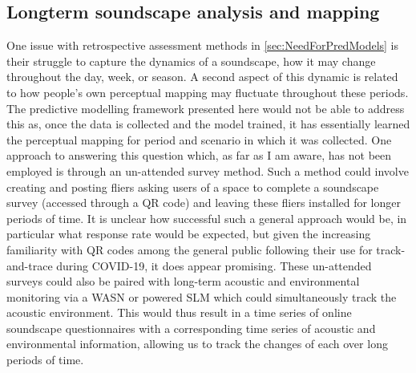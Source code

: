 \subsection{Longterm soundscape analysis and mapping}
One issue with retrospective assessment methods in \cref{sec:NeedForPredModels} is their struggle to capture the dynamics of a soundscape, how it may change throughout the day, week, or season. A second aspect of this dynamic is related to how people's own perceptual mapping may fluctuate throughout these periods. The predictive modelling framework presented here would not be able to address this as, once the data is collected and the model trained, it has essentially learned the perceptual mapping for period and scenario in which it was collected. One approach to answering this question which, as far as I am aware, has not been employed is through an un-attended survey method. Such a method could involve creating and posting fliers asking users of a space to complete a soundscape survey (accessed through a QR code) and leaving these fliers installed for longer periods of time. It is unclear how successful such a general approach would be, in particular what response rate would be expected, but given the increasing familiarity with QR codes among the general public following their use for track-and-trace during COVID-19, it does appear promising. These un-attended surveys could also be paired with long-term acoustic and environmental monitoring via a WASN or powered SLM which could simultaneously track the acoustic environment. This would thus result in a time series of online soundscape questionnaires with a corresponding time series of acoustic and environmental information, allowing us to track the changes of each over long periods of time.

